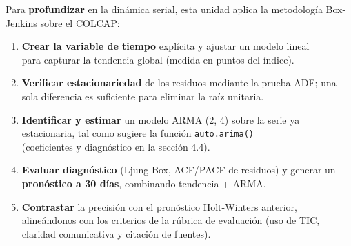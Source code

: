 \documentclass[
  11pt,
]{book}
\newenvironment{Shaded}{\begin{snugshade}}{\end{snugshade}}
\newcommand{\AttributeTok}[1]{\textcolor[rgb]{0.13,0.29,0.53}{#1}}
\newcommand{\CommentTok}[1]{\textcolor[rgb]{0.56,0.35,0.01}{\textit{#1}}}
\newcommand{\ConstantTok}[1]{\textcolor[rgb]{0.56,0.35,0.01}{#1}}
\newcommand{\DecValTok}[1]{\textcolor[rgb]{0.00,0.00,0.81}{#1}}
\newcommand{\FunctionTok}[1]{\textcolor[rgb]{0.13,0.29,0.53}{\textbf{#1}}}
\newcommand{\NormalTok}[1]{#1}
\newcommand{\SpecialCharTok}[1]{\textcolor[rgb]{0.81,0.36,0.00}{\textbf{#1}}}
\newcommand{\StringTok}[1]{\textcolor[rgb]{0.31,0.60,0.02}{#1}}
\providecommand{\tightlist}{%
  \setlength{\itemsep}{0pt}\setlength{\parskip}{0pt}}
\begin{document}
Para \textbf{profundizar} en la dinámica serial, esta unidad aplica la metodología
Box-Jenkins sobre el COLCAP:

\begin{enumerate}
\def\labelenumi{\arabic{enumi}.}
\tightlist
\item
  \textbf{Crear la variable de tiempo} explícita y ajustar un modelo lineal\\
  para capturar la tendencia global (medida en puntos del índice).
\item
  \textbf{Verificar estacionariedad} de los residuos mediante la prueba
  ADF; una sola diferencia es suficiente para eliminar la raíz unitaria.
\item
  \textbf{Identificar y estimar} un modelo ARMA (2, 4) sobre la serie ya
  estacionaria, tal como sugiere la función \texttt{auto.arima()}\\
  (coeficientes y diagnóstico en la sección 4.4).
\item
  \textbf{Evaluar diagnóstico} (Ljung-Box, ACF/PACF de residuos) y generar
  un \textbf{pronóstico a 30 días}, combinando tendencia + ARMA.
\item
  \textbf{Contrastar} la precisión con el pronóstico Holt-Winters anterior,
  alineándonos con los criterios de la rúbrica de evaluación
  (uso de TIC, claridad comunicativa y citación de fuentes).
\end{enumerate}

\begin{Shaded}
\end{Shaded}
\end{document}
